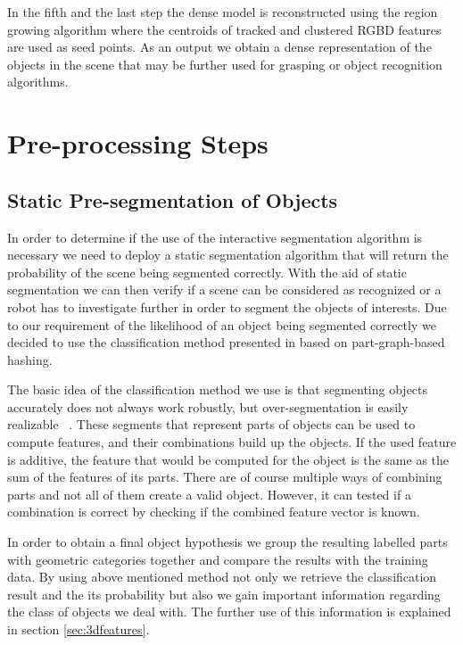  In the fifth and the last step the dense model is reconstructed using the region growing algorithm 
where the centroids of tracked and clustered RGBD features are
used as seed points. As an output we obtain a dense representation of the objects in the scene that may be further used for grasping or object recognition algorithms.

\section{Pre-processing Steps}


\subsection{Static Pre-segmentation of Objects}
\label{sec:static-seg}

In order to determine if the use of the interactive segmentation algorithm is necessary we need to deploy a static segmentation algorithm that will return the probability of the scene being segmented correctly. With the aid of static segmentation we can then verify if a scene can be considered as recognized or a robot has to investigate further in order to segment the objects of interests. Due to our requirement of the likelihood of an object being segmented correctly we decided to use the classification method presented in \cite{marton12SC} based on part-graph-based hashing.

The basic idea of the classification method we use is that
segmenting objects accurately does not always work
robustly, but over-segmentation is easily realizable ~\cite{soupofsegments,Lai_Fox_2010,mozos11furniture}.
These segments that represent parts of objects can be used
to compute features, and their combinations build up the
objects. If the used feature is additive, the feature that
would be computed for the object is the same as the sum
of the features of its parts.
There are of course multiple ways of combining parts
and not all of them create a valid object. However, it can
tested if a combination is correct by checking if the
combined feature vector is known. 

In order to obtain a final object hypothesis we group the resulting labelled parts with geometric categories together and compare the results with the training data. By using above mentioned method not only we retrieve the classification result and the its probability but also we gain important information regarding the class of objects we deal with. The further use of this information is explained in section \ref{sec:3dfeatures}.














